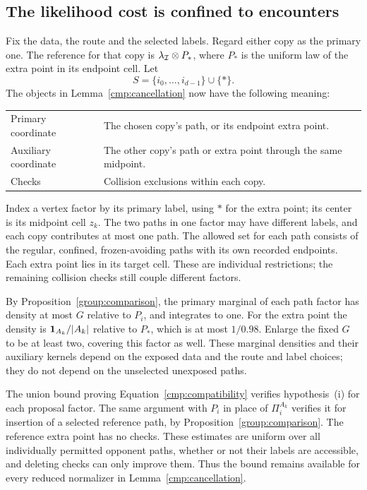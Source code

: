 \subsection{The likelihood cost is confined to encounters}

Fix the data, the route and the selected labels. Regard either copy as the
primary one. The reference for that copy is
$\lambda_{\mathcal I}\otimes P_*$, where $P_*$ is the uniform law of the extra
point in its endpoint cell. Let
\[
 S=\{i_0,\ldots,i_{d-1}\}\cup\{*\}.
\]
The objects in Lemma~\ref{cmp:cancellation} now have the following meaning:
\begin{center}
\begin{tabular}{@{}p{.24\linewidth}p{.70\linewidth}@{}}
\toprule
Primary coordinate & The chosen copy's path, or its endpoint extra point.\\
Auxiliary coordinate & The other copy's path or extra point through the same midpoint.\\
Checks & Collision exclusions within each copy.\\
\bottomrule
\end{tabular}
\end{center}
Index a vertex factor by its primary label, using $*$ for the extra point;
its center is its midpoint cell $z_k$. The two paths in one factor may have
different labels, and each copy contributes at most one path. The allowed
set for each path consists of the regular, confined, frozen-avoiding paths
with its own recorded endpoints. Each extra point lies in its target cell.
These are individual restrictions; the remaining collision checks still
couple different factors.

By Proposition~\ref{group:comparison}, the primary marginal of each path
factor has density at most $G$ relative to $P_i$, and integrates to one.
For the extra point the density is $\mathbf 1_{A_k}/|A_k|$ relative to $P_*$,
which is at most $1/0.98$. Enlarge the fixed $G$ to be at least two, covering
this factor as well. These marginal densities and their auxiliary kernels
depend on the exposed data and the route and label choices; they do not
depend on the unselected unexposed paths.

The union bound proving Equation~\eqref{cmp:compatibility} verifies
hypothesis~\textup{(i)} for each proposal factor. The same argument with
$P_i$ in place of $\Pi_i^{A_k}$ verifies it for insertion of a selected
reference path, by Proposition~\ref{group:comparison}. The reference extra
point has no checks. These estimates are uniform over all individually
permitted opponent paths, whether or not their labels are accessible, and
deleting checks can only improve them. Thus the bound remains available
for every reduced normalizer in Lemma~\ref{cmp:cancellation}.

